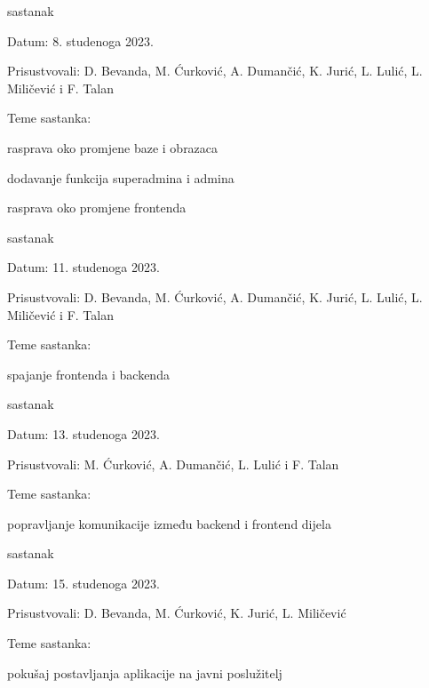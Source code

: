 \begin{packed_enum}
            		\item  sastanak
			\item[] \begin{packed_item}
				\item Datum: 8. studenoga 2023.
				\item Prisustvovali: D. Bevanda, M. Ćurković, A. Dumančić, K. Jurić, L. Lulić, L. Miličević i F. Talan
				\item Teme sastanka:
				\begin{packed_item}
					\item rasprava oko promjene baze i obrazaca
                    			\item dodavanje funkcija superadmina i admina
					\item rasprava oko promjene frontenda
				\end{packed_item}
			\end{packed_item}

   			\item  sastanak
			\item[] \begin{packed_item}
				\item Datum: 11. studenoga 2023.
				\item Prisustvovali: D. Bevanda, M. Ćurković, A. Dumančić, K. Jurić, L. Lulić, L. Miličević i F. Talan
				\item Teme sastanka:
				\begin{packed_item}
					\item spajanje frontenda i backenda
				\end{packed_item}
			\end{packed_item}

			\item  sastanak
			\item[] \begin{packed_item}
				\item Datum: 13. studenoga 2023.
				\item Prisustvovali: M. Ćurković, A. Dumančić,  L. Lulić i F. Talan
				\item Teme sastanka:
				\begin{packed_item}
					\item popravljanje komunikacije između backend i frontend dijela
				\end{packed_item}
			\end{packed_item}

			\item  sastanak
			\item[] \begin{packed_item}
				\item Datum: 15. studenoga 2023.
				\item Prisustvovali: D. Bevanda, M. Ćurković, K. Jurić, L. Miličević
				\item Teme sastanka:
				\begin{packed_item}
					\item pokušaj postavljanja aplikacije na javni poslužitelj
				\end{packed_item}
			\end{packed_item}


\end{packed_enum}
